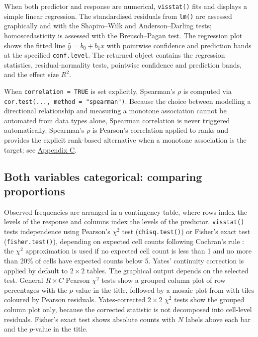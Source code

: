 When both predictor and response are numerical, \texttt{visstat()} fits and
displays a simple linear regression. The standardised residuals from
\texttt{lm()} are assessed graphically and with the Shapiro--Wilk and
Anderson--Darling tests; homoscedasticity is assessed with the
Breusch--Pagan test. The regression plot shows the fitted line
\(\hat{y} = b_0 + b_1 x\) with pointwise confidence and prediction bands
at the specified \texttt{conf.level}. The returned object contains the
regression statistics, residual-normality tests, pointwise confidence
and prediction bands, and the effect size \(R^2\).

When \texttt{correlation\ =\ TRUE} is set explicitly,
Spearman's \(\rho\) is computed via \texttt{cor.test(...,\ method\ =\ "spearman")}.
Because the choice between modelling a directional relationship and
measuring a monotone association cannot be automated from data types
alone, Spearman correlation is never triggered automatically.
Spearman's \(\rho\) is Pearson's correlation applied to ranks and provides
the explicit rank-based alternative when a monotone association is the
target; see \hyperref[rho]{Appendix C}.

\subsection{Both variables categorical: comparing proportions}\label{both-variables-categorical-comparing-proportions}

Observed frequencies are arranged in a contingency table, where rows
index the levels of the response and columns index the levels of the
predictor. \texttt{visstat()} tests independence using Pearson's \(\chi^2\) test
(\texttt{chisq.test()}) or Fisher's exact test (\texttt{fisher.test()}), depending on
expected cell counts following Cochran's rule \citep{Cochran:1954}: the
\(\chi^2\) approximation is used if no expected cell count is less than 1
and no more than 20\% of cells have expected counts below 5. Yates'
continuity correction \citep{Yates:1934} is applied by default to \(2 \times
2\) tables. The graphical output depends on the selected test. General
\(R \times C\) Pearson \(\chi^2\) tests show a grouped column plot of row
percentages with the \(p\)-value in the title, followed by a mosaic plot
from  \citep{Meyer:2006, Meyer:2024} with tiles coloured by
Pearson residuals. Yates-corrected \(2 \times 2\) \(\chi^2\) tests show the
grouped column plot only, because the corrected statistic is not
decomposed into cell-level residuals. Fisher's exact test shows
absolute counts with \(N\) labels above each bar and the \(p\)-value in the
title.

